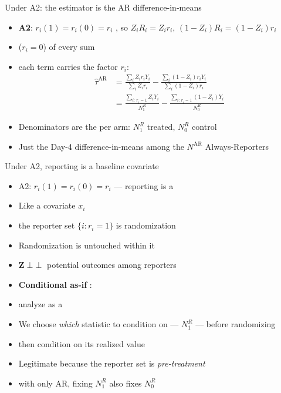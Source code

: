 \documentclass[table, xcolor = {dvipsnames}, 9pt]{beamer}
\theoremstyle{plain}
\newcommand{\mh}[1]{{\color{magenta}{#1}}}
\DeclareMathOperator{\indep}{{\perp\!\!\!\perp}}
\begin{document}
\begin{frame}[t]{Under A2: the estimator is the AR difference-in-means}
\vfill
\begin{itemize} \vfill
\item \textbf{A2}: $r_i(1) = r_i(0) = r_i$ \mh{fixed}, so $Z_i R_i = Z_i r_i$, $\left(1 - Z_i\right) R_i = \left(1 - Z_i\right) r_i$ \vfill
\item \mh{Never-Reporters} ($r_i = 0$) \mh{drop out} of every sum \vfill
\item[] each term carries the factor $r_i$: \vfill
\begin{align*}
\hat{\tau}^{\textrm{AR}} &= \frac{\sum_i Z_i r_i Y_i}{\sum_i Z_i r_i} - \frac{\sum_i \left(1 - Z_i\right) r_i Y_i}{\sum_i \left(1 - Z_i\right) r_i} \\
&= \frac{\sum_{i:\, r_i = 1} Z_i Y_i}{N_1^R} - \frac{\sum_{i:\, r_i = 1} \left(1 - Z_i\right) Y_i}{N_0^R}
\end{align*} \vfill
\item Denominators are the \mh{numbers of reporters} per arm: $N_1^R$ treated, $N_0^R$ control \vfill
\item Just the Day-4 difference-in-means among the $N^{\textrm{AR}}$ Always-Reporters \vfill
\end{itemize} \vfill
\end{frame}
\begin{frame}[t]{Under A2, reporting is a baseline covariate}
\vfill
\begin{itemize} \vfill
\item A2: $r_i(1) = r_i(0) = r_i$ --- reporting is a \mh{fixed pre-treatment attribute} \vfill
\item[] Like a covariate $x_i$ \vfill
\item[] the reporter set $\{i : r_i = 1\}$ is \mh{fixed before} randomization \vfill
\item Randomization is untouched within it \vfill
\item[] $\bm{Z} \indep$ potential outcomes among reporters \vfill
\item \textbf{Conditional as-if} \citep{pashleyetal2021}: \vfill
\item[] analyze as a \mh{CRE among the reporters} \vfill
\item[] We choose \emph{which} statistic to condition on --- $N_1^R$ --- before randomizing \vfill
\item[] then condition on its realized value \vfill
\item[] Legitimate because the reporter set is \emph{pre-treatment} \vfill
\item[] with only AR, fixing $N_1^R$ also fixes $N_0^R$ \vfill
\end{itemize} \vfill
\end{frame}
\end{document}
